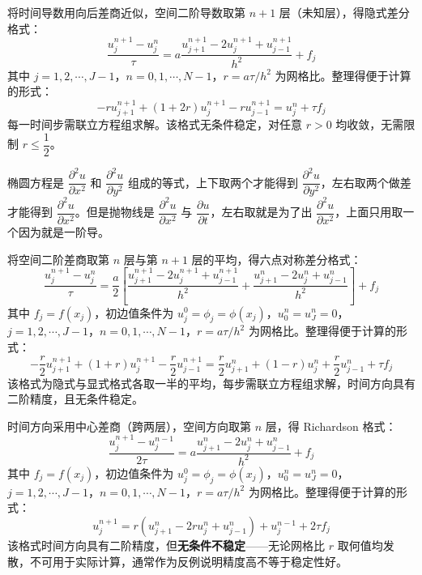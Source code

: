 \begin{definition}
将时间导数用向后差商近似，空间二阶导数取第 $n+1$ 层（未知层），得隐式差分格式：
\[
\frac{u_j^{n+1} - u_j^n}{\tau} = a\frac{u_{j+1}^{n+1} - 2u_j^{n+1} + u_{j-1}^{n+1}}{h^2} + f_j
\]
其中 $j = 1,2,\cdots,J-1$，$n = 0,1,\cdots,N-1$，$r = a\tau/h^2$ 为网格比。整理得便于计算的形式：
\[
-ru_{j+1}^{n+1} + (1+2r)u_j^{n+1} - ru_{j-1}^{n+1} = u_j^n + \tau f_j
\]
每一时间步需联立方程组求解。该格式无条件稳定，对任意 $r > 0$ 均收敛，无需限制 $r \leq \dfrac{1}{2}$。
\end{definition}
\begin{dxtips}[椭圆方程与抛物线方程的区别]
  椭圆方程是 $\dfrac{\partial^2 u}{\partial x^2}$ 和 $\dfrac{\partial^2 u}{\partial y^2}$ 组成的等式，上下取两个才能得到 $\dfrac{\partial^2 u}{\partial y^2}$，左右取两个做差才能得到 $\dfrac{\partial^2 u}{\partial x^2}$。但是抛物线是 $\dfrac{\partial^2 u}{\partial x^2}$ 与 $\dfrac{\partial u}{\partial t}$，左右取就是为了出 $\dfrac{\partial^2 u}{\partial x^2}$，上面只用取一个因为就是一阶导。
\end{dxtips}
\begin{definition}
将空间二阶差商取第 $n$ 层与第 $n+1$ 层的平均，得六点对称差分格式：
\[
\frac{u_j^{n+1} - u_j^n}{\tau} = \frac{a}{2}\left[\frac{u_{j+1}^{n+1} - 2u_j^{n+1} + u_{j-1}^{n+1}}{h^2} + \frac{u_{j+1}^{n} - 2u_j^{n} + u_{j-1}^{n}}{h^2}\right] + f_j
\]
其中 $f_j = f(x_j)$，初边值条件为 $u_j^0 = \phi_j = \phi(x_j)$，$u_0^n = u_J^n = 0$，$j = 1,2,\cdots,J-1$，$n = 0,1,\cdots,N-1$，$r = a\tau/h^2$ 为网格比。整理得便于计算的形式：
\[
-\frac{r}{2}u_{j+1}^{n+1} + (1+r)u_j^{n+1} - \frac{r}{2}u_{j-1}^{n+1} = \frac{r}{2}u_{j+1}^n + (1-r)u_j^n + \frac{r}{2}u_{j-1}^n + \tau f_j
\]
该格式为隐式与显式格式各取一半的平均，每步需联立方程组求解，时间方向具有二阶精度，且无条件稳定。
\end{definition}
\begin{definition}
时间方向采用中心差商（跨两层），空间方向取第 $n$ 层，得 Richardson 格式：
\[
\frac{u_j^{n+1} - u_j^{n-1}}{2\tau} = a\frac{u_{j+1}^{n} - 2u_j^{n} + u_{j-1}^{n}}{h^2} + f_j
\]
其中 $f_j = f(x_j)$，初边值条件为 $u_j^0 = \phi_j = \phi(x_j)$，$u_0^n = u_J^n = 0$，$j = 1,2,\cdots,J-1$，$n = 0,1,\cdots,N-1$，$r = a\tau/h^2$ 为网格比。整理得便于计算的形式：
\[
u_j^{n+1} = r\left(u_{j+1}^n - 2ru_j^n + u_{j-1}^n\right) + u_j^{n-1} + 2\tau f_j
\]
该格式时间方向具有二阶精度，但\textbf{无条件不稳定}——无论网格比 $r$ 取何值均发散，不可用于实际计算，通常作为反例说明精度高不等于稳定性好。
\end{definition}
